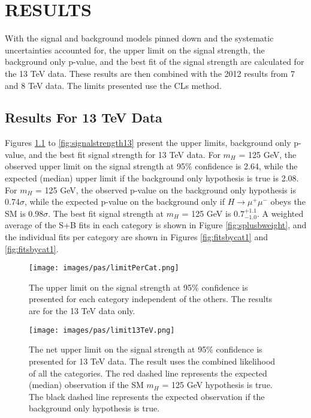 \chapter{RESULTS} \label{results}

With the signal and background models pinned down and the systematic uncertainties accounted for, the upper limit on the signal strength, the background only p-value, and the best fit of the signal strength are calculated for the 13 TeV data. These results are then combined with the 2012 results from 7 and 8 TeV data. The limits presented use the CLs method.  

\section{Results For 13 TeV Data}
Figures \ref{fig:limitPerCat} to \ref{fig:signalstrength13} present the upper limits, background only p-value, and the best fit signal strength for 13 TeV data. For $m_H$ = 125 GeV, the observed upper limit on the signal strength at 95\% confidence is 2.64, while the expected (median) upper limit if the background only hypothesis is true is 2.08. For $m_H$ = 125 GeV, the observed p-value on the background only hypothesis is 0.74$\sigma$, while the expected p-value on the background only if $H\rightarrow\mu^+\mu^-$ obeys the SM is 0.98$\sigma$. The best fit signal strength at $m_H$ = 125 GeV is $0.7^{+1.1}_{-1.0}$. A weighted average of the S+B fits in each category is shown in Figure \ref{fig:splusbweight}, and the individual fits per category are shown in Figures \ref{fig:fitsbycat1} and \ref{fig:fitsbycat1}. 
\begin{figure}[h!]
    \centering
    \texttt{[image: images/pas/limitPerCat.png]}
    \caption[The upper limit on the signal strength for the individual categories on 13 TeV data alone.]
    {The upper limit on the signal strength at 95\% confidence is presented for each category independent of the others. The results are for the 13 TeV data only.}
    \label{fig:limitPerCat}
\end{figure}
\begin{figure}[h!]
    \centering
    \texttt{[image: images/pas/limit13TeV.png]}
    \caption[The net upper limit on the signal strength for 13 TeV data alone.]
    {The net upper limit on the signal strength at 95\% confidence is presented for 13 TeV data. The result uses the combined likelihood of all the categories. The red dashed line represents the expected (median) observation if the SM $m_H$ = 125 GeV hypothesis is true. The black dashed line represents the expected observation if the background only hypothesis is true.}
    \label{fig:limit13}
\end{figure}
